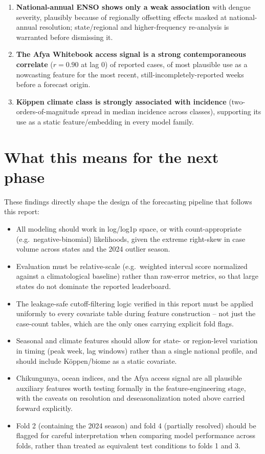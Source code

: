 \documentclass[11pt]{report}
\begin{document}
\begin{enumerate}
\item \textbf{National-annual ENSO shows only a weak association} with dengue severity, plausibly because of regionally offsetting effects masked at national-annual resolution; state/regional and higher-frequency re-analysis is warranted before dismissing it.
\item \textbf{The Afya Whitebook access signal is a strong contemporaneous correlate} ($r=0.90$ at lag 0) of reported cases, of most plausible use as a nowcasting feature for the most recent, still-incompletely-reported weeks before a forecast origin.
\item \textbf{K\"oppen climate class is strongly associated with incidence} (two-orders-of-magnitude spread in median incidence across classes), supporting its use as a static feature/embedding in every model family.
\end{enumerate}

\section{What this means for the next phase}
These findings directly shape the design of the forecasting pipeline that follows this report:
\begin{itemize}
\item All modeling should work in log/log1p space, or with count-appropriate (e.g.\ negative-binomial) likelihoods, given the extreme right-skew in case volume across states and the 2024 outlier season.
\item Evaluation must be relative-scale (e.g.\ weighted interval score normalized against a climatological baseline) rather than raw-error metrics, so that large states do not dominate the reported leaderboard.
\item The leakage-safe cutoff-filtering logic verified in this report must be applied uniformly to every covariate table during feature construction -- not just the case-count tables, which are the only ones carrying explicit fold flags.
\item Seasonal and climate features should allow for state- or region-level variation in timing (peak week, lag windows) rather than a single national profile, and should include K\"oppen/biome as a static covariate.
\item Chikungunya, ocean indices, and the Afya access signal are all plausible auxiliary features worth testing formally in the feature-engineering stage, with the caveats on resolution and deseasonalization noted above carried forward explicitly.
\item Fold 2 (containing the 2024 season) and fold 4 (partially resolved) should be flagged for careful interpretation when comparing model performance across folds, rather than treated as equivalent test conditions to folds 1 and 3.
\end{itemize}
\end{document}
